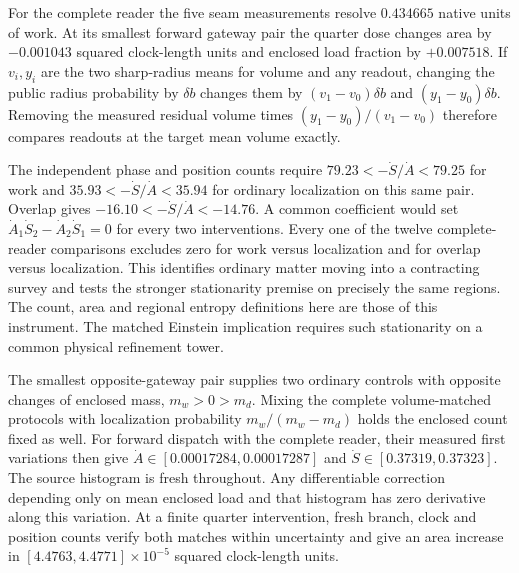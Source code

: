 \documentclass[11pt]{article}
\begin{document}
For the complete reader the five seam measurements resolve $0.434665$
native units of work. At its smallest forward gateway pair the quarter
dose changes area by $-0.001043$ squared clock-length units and enclosed
load fraction by $+0.007518$. If $v_i,y_i$ are the two sharp-radius means
for volume and any readout, changing the public radius probability by
$\delta b$ changes them by $(v_1-v_0)\delta b$ and $(y_1-y_0)\delta b$.
Removing the measured residual volume times $(y_1-y_0)/(v_1-v_0)$
therefore compares readouts at the target mean volume exactly.

The independent phase and position counts require
$79.23<-\dot S/\dot A<79.25$ for work and
$35.93<-\dot S/\dot A<35.94$ for ordinary localization on this same
pair. Overlap gives $-16.10<-\dot S/\dot A<-14.76$. A common coefficient
would set $\dot A_1\dot S_2-\dot A_2\dot S_1=0$ for every two interventions.
Every one of the twelve complete-reader comparisons excludes zero for
work versus localization and for overlap versus localization. This
identifies ordinary matter moving into a contracting survey and tests
the stronger stationarity premise on precisely the same regions.
The count, area and regional entropy definitions here are those of this
instrument. The matched Einstein implication requires such stationarity
on a common physical refinement tower.

The smallest opposite-gateway pair supplies two ordinary controls with
opposite changes of enclosed mass, $m_w>0>m_d$. Mixing the complete
volume-matched protocols with localization probability $m_w/(m_w-m_d)$
holds the enclosed count fixed as well. For forward dispatch with the
complete reader, their measured first variations then give
$\dot A\in[0.00017284,0.00017287]$ and
$\dot S\in[0.37319,0.37323]$. The source histogram is fresh throughout.
Any differentiable correction depending only on mean enclosed load and
that histogram has zero derivative along this variation. At a finite
quarter intervention, fresh branch, clock and position counts verify
both matches within uncertainty and give an area increase in
$[4.4763,4.4771]\times10^{-5}$ squared clock-length units.
\end{document}
